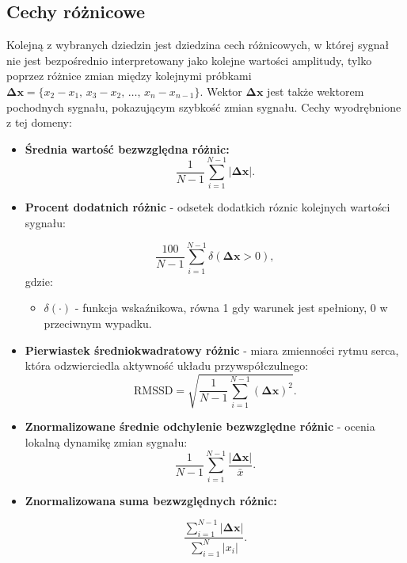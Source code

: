 \documentclass[a4paper,twoside,12pt]{book}
\begin{document}
\subsection*{Cechy różnicowe}
Kolejną z wybranych dziedzin jest dziedzina cech różnicowych, w której sygnał nie jest bezpośrednio interpretowany jako kolejne wartości amplitudy, tylko poprzez różnice zmian między kolejnymi próbkami $\boldsymbol{\Delta x} = \{x_2 - x_1,\, x_3 - x_2,\, \ldots,\, x_n - x_{n-1}\}$. Wektor $\boldsymbol{\Delta x}$ jest także wektorem pochodnych sygnału, pokazującym szybkość zmian sygnału.  Cechy wyodrębnione z tej domeny:

\begin{itemize}
	\setcounter{enumi}{4}
	\item \textbf{Średnia wartość bezwzględna różnic:}
	      \begin{equation}
		      \frac{1}{N-1} \sum_{i=1}^{N-1} |\boldsymbol{\Delta x}|.
	      \end{equation}
	\item \textbf{Procent dodatnich różnic} - odsetek dodatkich róznic kolejnych wartości sygnału:

	      \begin{equation}
		      \frac{100}{N-1} \sum_{i=1}^{N-1} \delta(\boldsymbol{\Delta x} > 0),
	      \end{equation}
	      \noindent gdzie:
	      \begin{itemize}
		      \item \( \delta(\cdot) \) - funkcja wskaźnikowa, równa 1 gdy warunek jest spełniony, 0 w przeciwnym wypadku.
	      \end{itemize}

	\item \textbf{Pierwiastek średniokwadratowy różnic} - miara zmienności rytmu serca, która odzwierciedla aktywność układu przywspółczulnego:~\cite{Farokhipour2023}
	      \begin{equation}
		      \text{RMSSD} = \sqrt{ \frac{1}{N-1} \sum_{i=1}^{N-1} (\boldsymbol{\Delta x})^2 }.
	      \end{equation}

	\item \textbf{Znormalizowane średnie odchylenie bezwzględne różnic} - ocenia lokalną dynamikę zmian sygnału:
	      \begin{equation}
		      \frac{1}{N-1} \sum_{i=1}^{N-1} \frac{|\boldsymbol{\Delta x}|}{\bar{x}}.
	      \end{equation}

	\item \textbf{Znormalizowana suma bezwzględnych różnic:}

	      \begin{equation}
		      \frac{\sum_{i=1}^{N-1} |\boldsymbol{\Delta x}|}{\sum_{i=1}^{N} |x_i|}.
	      \end{equation}

\end{itemize}
\end{document}
